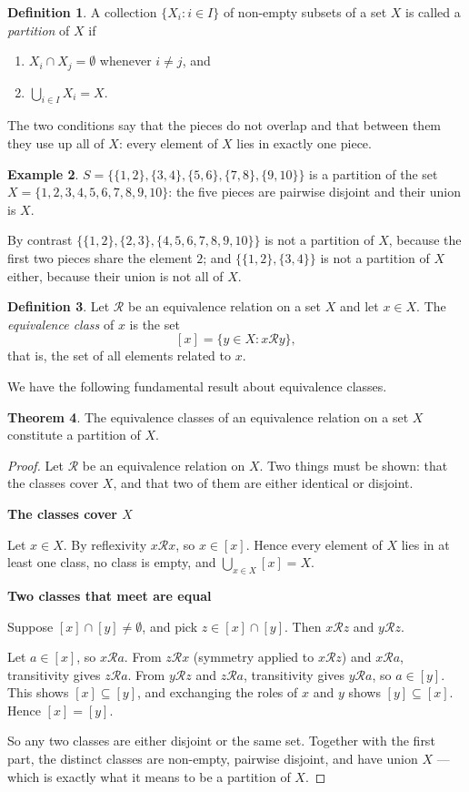 \documentclass[11pt,a4paper]{article}
\theoremstyle{definition}
\newtheorem{thm}{Theorem}[subsection]
\newtheorem{defn}[thm]{Definition}
\newtheorem{exa}[thm]{Example}
\newcommand{\subhead}[1]{%
  \par\medskip\noindent\textbf{#1}\par\nobreak\smallskip}
\begin{document}
\begin{defn}
A collection $\{X_i:i\in I\}$ of non-empty subsets of a set $X$ is called a
\emph{partition} of $X$ if
\begin{enumerate}
\item $X_i\cap X_j=\emptyset$ whenever $i\neq j$, and
\item $\bigcup_{i\in I}X_i=X$.
\end{enumerate}
The two conditions say that the pieces do not overlap and that between them
they use up all of $X$: every element of $X$ lies in exactly one piece.
\end{defn}
\begin{exa}
$S=\Big\{\{1,2\}, \{3,4\}, \{5,6\}, \{7,8\}, \{9,10\}\Big\}$ is a partition of
the set $X=\{1,2,3,4,5,6,7,8,9,10\}$: the five pieces are pairwise disjoint and
their union is $X$.

By contrast $\Big\{\{1,2\},\{2,3\},\{4,5,6,7,8,9,10\}\Big\}$ is not a partition
of $X$, because the first two pieces share the element $2$; and
$\Big\{\{1,2\},\{3,4\}\Big\}$ is not a partition of $X$ either, because their
union is not all of $X$.
\end{exa}
\begin{defn}
Let $\mathcal{R}$ be an equivalence relation on a set $X$ and let $x\in X$. The
\emph{equivalence class} of $x$ is the set
$$[x]=\{y\in X: x\mathcal{R}y\},$$
that is, the set of all elements related to $x$.
\end{defn}
We have the following fundamental result about equivalence classes.


\begin{thm}\label{thm:classes-partition}
The equivalence classes of an equivalence relation on a set $X$ constitute a
partition of $X$.
\end{thm}
\begin{proof}
Let $\mathcal{R}$ be an equivalence relation on $X$. Two things must be shown:
that the classes cover $X$, and that two of them are either identical or
disjoint.

\subhead{The classes cover $X$}
Let $x\in X$. By reflexivity $x\mathcal{R}x$, so $x\in [x]$. Hence every
element of $X$ lies in at least one class, no class is empty, and
$\bigcup_{x\in X}[x]=X$.

\subhead{Two classes that meet are equal}
Suppose $[x]\cap [y]\neq\emptyset$, and pick $z\in [x]\cap [y]$. Then
$x\mathcal{R}z$ and $y\mathcal{R}z$.

Let $a\in [x]$, so $x\mathcal{R}a$. From $z\mathcal{R}x$ (symmetry applied to
$x\mathcal{R}z$) and $x\mathcal{R}a$, transitivity gives $z\mathcal{R}a$. From
$y\mathcal{R}z$ and $z\mathcal{R}a$, transitivity gives $y\mathcal{R}a$, so
$a\in [y]$. This shows $[x]\subseteq [y]$, and exchanging the roles of $x$ and
$y$ shows $[y]\subseteq [x]$. Hence $[x]=[y]$.

So any two classes are either disjoint or the same set. Together with the first
part, the distinct classes are non-empty, pairwise disjoint, and have union
$X$ --- which is exactly what it means to be a partition of $X$.
\end{proof}
\end{document}
